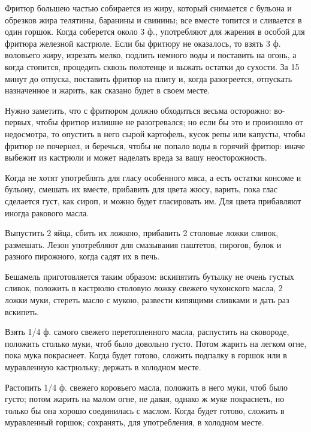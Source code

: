 Фритюр большею частью собирается из жиру, который снимается с бульона и обрезков жира телятины, баранины и свинины; все вместе топится и сливается в один горшок. Когда соберется около 3 ф., употребляют для жарения в особой для фритюра железной кастрюле. Если бы фритюру не оказалось, то взять 3 ф. воловьего жиру, изрезать мелко, подлить немного воды и поставить на огонь, а когда стопится, процедить сквозь полотенце и выжать остатки до сухости. За 15 минут до отпуска, поставить фритюр на плиту и, когда разогреется, отпускать назначенное и жарить, как сказано будет в своем месте.

Нужно заметить, что с фритюром должно обходиться весьма осторожно: во-первых, чтобы фритюр излишне не разогревался; но если бы это и произошло от недосмотра, то опустить в него сырой картофель, кусок репы или капусты, чтобы фритюр не почернел, и беречься, чтобы не попало воды в горячий фритюр: иначе выбежит из кастрюли и может наделать вреда за вашу неосторожность.


Когда не хотят употреблять для гласу особенного мяса, а есть остатки консоме и бульону, смешать их вместе, прибавить для цвета жюсу, варить, пока глас сделается густ, как сироп, и можно будет гласировать им. Для цвета прибавляют иногда ракового масла.


Выпустить 2 яйца, сбить их ложкою, прибавить 2 столовые ложки сливок, размешать. Лезон употребляют для смазывания паштетов, пирогов, булок и разного пирожного, когда садят их в печь.


Бешамель приготовляется таким образом: вскипятить бутылку не очень густых сливок, положить в кастрюлю столовую ложку свежего чухонского масла, 2 ложки муки, стереть масло с мукою, развести кипящими сливками и дать раз вскипеть.


Взять 1/4 ф. самого свежего перетопленного масла, распустить на сковороде, положить столько муки, чтоб было довольно густо. Потом жарить на легком огне, пока мука покраснеет. Когда будет готово, сложить подпалку в горшок или в муравленную кастрюльку; держать в холодном месте.


Растопить 1/4 ф. свежего коровьего масла, положить в него муки, чтоб было густо; потом жарить на малом огне, не давая, однако ж муке покраснеть, но только бы она хорошо соединилась с маслом. Когда будет готово, сложить в муравленный горшок; сохранять, для употребления, в холодном месте.

